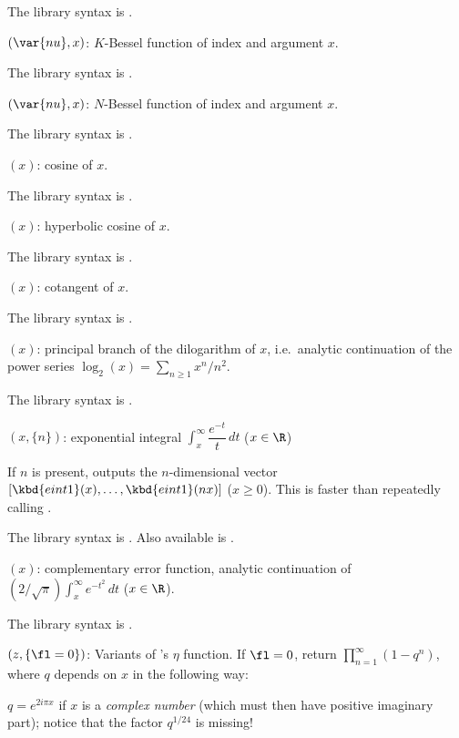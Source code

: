 The library syntax is .

$(\var{nu},x)$: \label{se:besselk}$K$-Bessel function of index  and argument $x$.

The library syntax is .

$(\var{nu},x)$: \label{se:besseln}$N$-Bessel function of index  and argument $x$.

The library syntax is .

$(x)$: \label{se:cos}cosine of $x$.

The library syntax is .

$(x)$: \label{se:cosh}hyperbolic cosine of $x$.

The library syntax is .

$(x)$: \label{se:cotan}cotangent of $x$.

The library syntax is .

$(x)$: \label{se:dilog}principal branch of the dilogarithm of $x$,
i.e.~analytic continuation of the power series $\log_2(x)=\sum_{n\ge1}x^n/n^2$.

The library syntax is .

$(x,\{n\})$: \label{se:eint1}exponential integral $\int_x^\infty \dfrac{e^{-t}}{t}\,dt$ ($x\in\R$)

If $n$ is present, outputs the $n$-dimensional vector
$[\kbd{eint1}(x),\dots,\kbd{eint1}(nx)]$ ($x \geq 0$). This is faster than
repeatedly calling .

The library syntax is .
Also available is .

$(x)$: \label{se:erfc}complementary error function, analytic continuation of
$(2/\sqrt\pi)\int_x^\infty e^{-t^2}\,dt$ ($x\in\R$).

The library syntax is .

$(z,\{\fl=0\})$: \label{se:eta}Variants of 's $\eta$ function.
If $\fl = 0$, return $\prod_{n=1}^\infty(1-q^n)$, where $q$ depends on $x$
in the following way:

\item $q = e^{2i\pi x}$ if $x$ is a \emph{complex number} (which must then
have positive imaginary part); notice that the factor $q^{1/24}$ is
missing!

